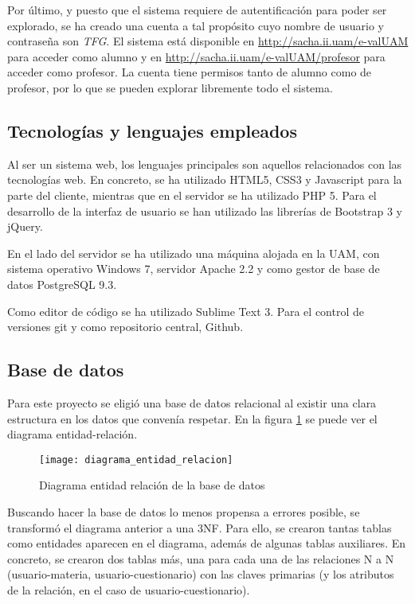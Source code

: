 Por último, y puesto que el sistema requiere de autentificación para poder ser explorado, se ha creado una cuenta a tal propósito cuyo nombre de usuario y contraseña son \textit{TFG}. El sistema está disponible en \url{http://sacha.ii.uam/e-valUAM} para acceder como alumno y en \url{http://sacha.ii.uam/e-valUAM/profesor} para acceder como profesor. La cuenta tiene permisos tanto de alumno como de profesor, por lo que se pueden explorar libremente todo el sistema.

\subsection{Tecnologías y lenguajes empleados\label{sec:tecnologias}}

Al ser un sistema web, los lenguajes principales son aquellos relacionados con las tecnologías web. En concreto, se ha utilizado HTML5, CSS3 y Javascript para la parte del cliente, mientras que en el servidor se ha utilizado PHP 5. Para el desarrollo de la interfaz de usuario se han utilizado las librerías de Bootstrap 3 y jQuery.

En el lado del servidor se ha utilizado una máquina alojada en la UAM, con sistema operativo Windows 7, servidor Apache 2.2 y como gestor de base de datos PostgreSQL 9.3.

Como editor de código se ha utilizado Sublime Text 3. Para el control de versiones git y como repositorio central, Github.


\subsection{Base de datos}

Para este proyecto se eligió una base de datos relacional al existir una clara estructura en los datos que convenía respetar. En la figura \ref{fig:base de datos} se puede ver el diagrama entidad-relación.

\begin{figure}[htp!]
	\centering
	\texttt{[image: diagrama\_entidad\_relacion]}
	\caption{Diagrama entidad relación de la base de datos}
	\label{fig:base de datos}
\end{figure}

Buscando hacer la base de datos lo menos propensa a errores posible, se transformó el diagrama anterior a una 3NF. Para ello, se crearon tantas tablas como entidades aparecen en el diagrama, además de algunas tablas auxiliares. En concreto, se crearon dos tablas más, una para cada una de las relaciones N a N (usuario-materia, usuario-cuestionario) con las claves primarias (y los atributos de la relación, en el caso de usuario-cuestionario). 

